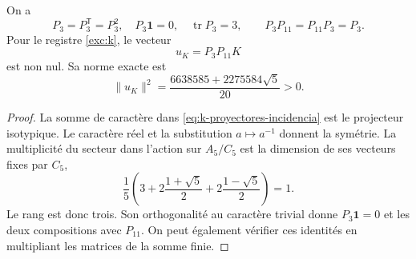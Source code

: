\begin{lemma}
\label{lem:k-sector-no-nulo}
On a
\[
 P_3=P_3^{\mathsf T}=P_3^2,\quad
 P_3\mathbf1=0,\quad \operatorname{tr}P_3=3,
 \qquad P_3P_{11}=P_{11}P_3=P_3.
\]
Pour le registre \eqref{exc:k}, le vecteur
\begin{equation}
 u_K=P_3P_{11}K
 \label{eq:k-vector-direccional}
\end{equation}
est non nul. Sa norme exacte est
\begin{equation}
 \lVert u_K\rVert^2
 =\frac{6638585+2275584\sqrt5}{20}>0.
 \label{eq:k-norma-direccion}
\end{equation}
\end{lemma}
\begin{proof}
La somme de caractère dans \eqref{eq:k-proyectores-incidencia} est le
projecteur isotypique. Le caractère réel et la substitution \(a\mapsto a^{-1}\)
donnent la symétrie. La multiplicité du secteur dans l'action sur
\(A_5/C_5\) est la dimension de ses vecteurs fixes par \(C_5\),
\[
 \frac15\left(3+2\frac{1+\sqrt5}{2}
                 +2\frac{1-\sqrt5}{2}\right)=1.
\]
Le rang est donc trois. Son orthogonalité au caractère trivial donne \(P_3\mathbf1=0\) et les deux compositions avec \(P_{11}\). On peut également vérifier ces identités en multipliant les matrices de la somme finie.


\end{proof}
